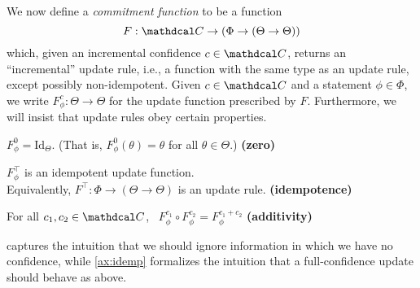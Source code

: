 \documentclass{article}
\def\cofunc{commitment function}
\def\confdom{\mathdcal C}
\begin{document}
We now define a \emph{\cofunc} to be a function
\[
    F: \confdom \to ( \Phi \to (\Theta \to \Theta))
\]
which, given an incremental confidence $c \in \mathbb \confdom$, returns an ``incremental'' update rule, i.e., a function with the same type as an update rule, except possibly non-idempotent.
Given $c \in \confdom$ and a statement $\phi \in \Phi$, we write
$F^c_\phi : \Theta \to \Theta$
for the update function prescribed by $F$.
Furthermore, we will insist that update rules obey certain properties.
\begin{CFaxioms}
    \item  $F^{0}_\phi  = {\mathrm{Id}}_{\Theta}$.
        (That is, $F^{0}_\phi(\theta) = \theta$ for all $\theta \in \Theta$.)
        \hfill \textbf{(zero)} \label{ax:zero}
    \item
        $F^\top_\phi$ is an idempotent update function.\\
        Equivalently, $F^\top: \Phi \to (\Theta \to \Theta)$ is an update rule.
        \hfill \textbf{(idempotence)} \label{ax:idemp}
    \item For all $c_1, c_2 \in \confdom$,~
        $F^{c_1}_\phi \circ F^{c_2}_\phi = F^{c_1 + c_2}_\phi$
        \hfill \textbf{(additivity)} \label{ax:additivity}
\end{CFaxioms}
 captures the intuition that we should ignore information in which we have no confidence, while \cref{ax:idemp} formalizes the intuition that a full-confidence update should behave as above.
\end{document}
